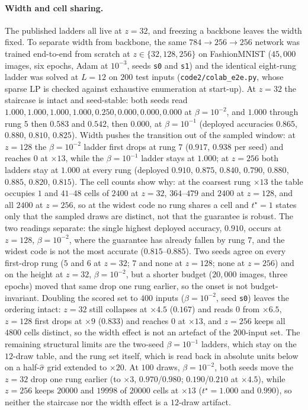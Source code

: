 \documentclass[11pt]{article}
\begin{document}
\paragraph{Width and cell sharing.}
The published ladders all live at $z=32$, and freezing a backbone leaves the width fixed. To
separate width from backbone, the same $784\to256\to256$ network was trained end-to-end from scratch
at $z\in\{32,128,256\}$ on FashionMNIST ($45{,}000$ images, six epochs, Adam at $10^{-3}$, seeds
\texttt{s0} and \texttt{s1}) and the identical eight-rung ladder was solved at $L=12$ on $200$ test
inputs (\texttt{code2/colab\_e2e.py}, whose sparse LP is checked against exhaustive enumeration at
start-up). At $z=32$ the staircase is intact and seed-stable: both seeds read
$1.000, 1.000, 1.000, 1.000, 0.250, 0.000, 0.000, 0.000$ at $\beta=10^{-2}$, and
$1.000$ through rung $5$ then $0.583$ and $0.542$, then $0.000$, at $\beta=10^{-1}$ (deployed
accuracies $0.865$, $0.880$, $0.810$, $0.825$). Width pushes the transition out of the sampled
window: at $z=128$ the $\beta=10^{-2}$ ladder first drops at rung $7$ ($0.917$, $0.938$ per seed) and
reaches $0$ at $\times13$, while the $\beta=10^{-1}$ ladder stays at $1.000$; at $z=256$ both ladders
stay at $1.000$ at every rung (deployed $0.910$, $0.875$, $0.840$, $0.790$, $0.880$, $0.885$,
$0.820$, $0.815$). The cell counts show why: at the coarsest rung $\times13$ the table occupies $1$
and $41$--$48$ cells of $2400$ at $z=32$, $364$--$479$ and $2400$ at $z=128$, and all $2400$ at
$z=256$, so at the widest code no rung shares a cell and $t^\star=1$ states only that the sampled
draws are distinct, not that the guarantee is robust. The two readings separate: the single highest
deployed accuracy, $0.910$, occurs at $z=128$, $\beta=10^{-2}$, where the guarantee has already
fallen by rung $7$, and the widest code is not the most accurate ($0.815$--$0.885$). Two seeds agree
on every first-drop rung ($5$ and $6$ at $z=32$; $7$ and none at $z=128$; none at $z=256$) and on
the height at $z=32$, $\beta=10^{-2}$, but a shorter budget
($20{,}000$ images, three epochs) moved that same drop one rung earlier, so the onset is not
budget-invariant. Doubling the scored set to $400$ inputs ($\beta=10^{-2}$, seed \texttt{s0})
leaves the ordering intact: $z=32$ still collapses at $\times4.5$ ($0.167$) and reads $0$ from
$\times6.5$, $z=128$ first drops at $\times9$ ($0.833$) and reaches $0$ at $\times13$, and $z=256$
keeps all $4800$ cells distinct, so the width effect is not an artefact of the $200$-input set. The
remaining structural limits are the two-seed $\beta=10^{-1}$ ladders, which stay on the $12$-draw
table, and the rung set itself, which is read back in absolute units below on a half-$\hat\sigma$
grid extended to $\times20$. At
$100$ draws, $\beta=10^{-2}$, both seeds move the $z=32$ drop one rung earlier (to $\times3$,
$0.970$/$0.980$; $0.190$/$0.210$ at $\times4.5$), while $z=256$ keeps $20000$ and $19998$
of $20000$ cells at $\times13$ ($t^\star=1.000$ and $0.990$), so neither the staircase nor the
width effect is a $12$-draw artifact.
\end{document}
